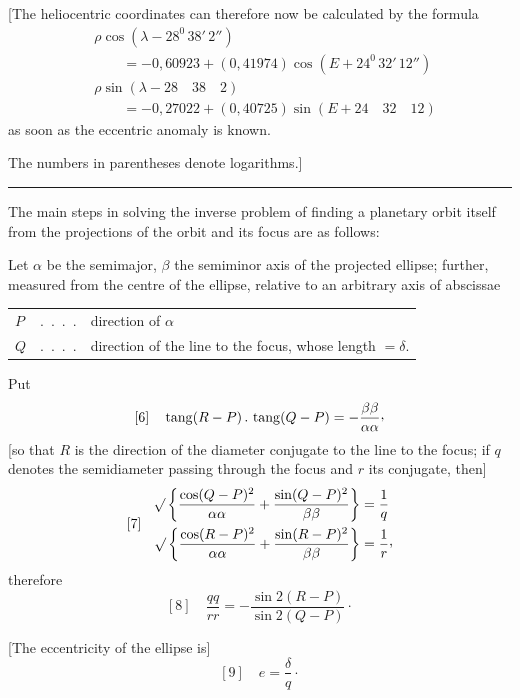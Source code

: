 [The heliocentric coordinates can therefore now be calculated by the formula
\[
\begin{aligned}
&\rho\cos(\lambda-28^0\,38'\,2'')\\
&\qquad=-0{,}60923+(0{,}41974)\cos(E+24^0\,32'\,12'')\\
&\rho\sin(\lambda-28\quad38\quad2)\\
&\qquad=-0{,}27022+(0{,}40725)\sin(E+24\quad32\quad12)
\end{aligned}
\]
as soon as the eccentric anomaly is known.

The numbers in parentheses denote logarithms.]
\begin{center}\rule{.3\linewidth}{.4pt}\end{center}

The main steps in solving the inverse problem of finding a planetary orbit itself from the projections of the orbit and its focus are as follows:

Let \(\alpha\) be the semimajor, \(\beta\) the semiminor axis of the projected ellipse; further, measured from the centre of the ellipse, relative to an arbitrary axis of abscissae
\begin{center}
\begin{tabular}{@{}lcl@{}}
\(P\)&.\ .\ .\ .&direction of \(\alpha\)\\
\(Q\)&.\ .\ .\ .&\begin{minipage}[t]{.75\linewidth}direction of the line to the focus, whose length \(=\delta\).\end{minipage}
\end{tabular}
\end{center}

Put
\[
[6]\quad\operatorname{tang}(R-P)\,.\,\operatorname{tang}(Q-P)
=-\frac{\beta\beta}{\alpha\alpha}\mathpunct{\raisebox{.45ex}{,}}
\]
[so that \(R\) is the direction of the diameter conjugate to the line to the focus; if \(q\) denotes the semidiameter passing through the focus and \(r\) its conjugate, then]
\[
[7]\quad\begin{aligned}
\BareRoot{\left\{\frac{\cos(Q-P)^2}{\alpha\alpha}+
\frac{\sin(Q-P)^2}{\beta\beta}\right\}}&=\frac{1}{q}\\
\BareRoot{\left\{\frac{\cos(R-P)^2}{\alpha\alpha}+
\frac{\sin(R-P)^2}{\beta\beta}\right\}}&=\frac{1}{r}\mathpunct{\raisebox{.45ex}{,}}
\end{aligned}
\]
therefore
\[
[8]\quad\frac{qq}{rr}=-\frac{\sin2(R-P)}{\sin2(Q-P)}\mathpunct{\cdot}
\]

[The eccentricity of the ellipse is]
\[
[9]\quad e=\frac{\delta}{q}\mathpunct{\cdot}
\]

